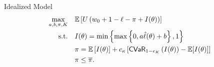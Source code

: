 \documentclass{beamer}
\begin{document}


\begin{frame}{Idealized Model}
\begin{align}
    \max_{a,b,\pi, K}  & \quad \mathbb{E} \left [ U\left ( w_0 + 1 - \ell - \pi + I(\theta) \right ) \right ] \label{cons-objective}\\
    \text{s.t.} & \quad I(\theta) =  \min \left \{\max \left \{0,a\hat{\ell}(\theta) + b \right \}, 1 \right \}\label{cons-contract}\\
    & \quad \pi = \mathbb{E}\left [ I(\theta) \right ] + c_{\kappa} \left[ {\sf CVaR}_{1-\epsilon_K}\left ( I(\theta)\right )  - \mathbb{E}[I(\theta)]  \right] \\
    &\quad \pi \leq \overline{\pi}.
\end{align}
\end{frame}
\end{document}
